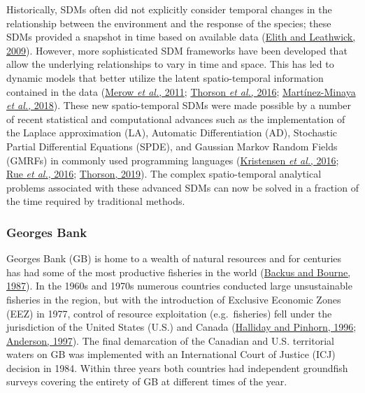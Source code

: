 \documentclass[
]{article}
\begin{document}
Historically, SDMs often did not explicitly consider temporal changes in the relationship between the environment and the response of the species; these SDMs provided a snapshot in time based on available data (\protect\hyperlink{ref-elithSpeciesDistributionModels2009}{Elith and Leathwick, 2009}). However, more sophisticated SDM frameworks have been developed that allow the underlying relationships to vary in time and space. This has led to dynamic models that better utilize the latent spatio-temporal information contained in the data (\protect\hyperlink{ref-merowDevelopingDynamicMechanistic2011}{Merow \emph{et al.}, 2011}; \protect\hyperlink{ref-thorsonJointDynamicSpecies2016}{Thorson \emph{et al.}, 2016}; \protect\hyperlink{ref-martinez-minayaSpeciesDistributionModeling2018}{Martínez-Minaya \emph{et al.}, 2018}). These new spatio-temporal SDMs were made possible by a number of recent statistical and computational advances such as the implementation of the Laplace approximation (LA), Automatic Differentiation (AD), Stochastic Partial Differential Equations (SPDE), and Gaussian Markov Random Fields (GMRFs) in commonly used programming languages (\protect\hyperlink{ref-kristensenTMBAutomaticDifferentiation2016}{Kristensen \emph{et al.}, 2016}; \protect\hyperlink{ref-rueBayesianComputingINLA2016}{Rue \emph{et al.}, 2016}; \protect\hyperlink{ref-thorsonGuidanceDecisionsUsing2019}{Thorson, 2019}). The complex spatio-temporal analytical problems associated with these advanced SDMs can now be solved in a fraction of the time required by traditional methods.

\hypertarget{georges-bank}{%
\subsubsection{Georges Bank}\label{georges-bank}}

Georges Bank (GB) is home to a wealth of natural resources and for centuries has had some of the most productive fisheries in the world (\protect\hyperlink{ref-backusGeorgesBank1987}{Backus and Bourne, 1987}). In the 1960s and 1970s numerous countries conducted large unsustainable fisheries in the region, but with the introduction of Exclusive Economic Zones (EEZ) in 1977, control of resource exploitation (e.g.~fisheries) fell under the jurisdiction of the United States (U.S.) and Canada (\protect\hyperlink{ref-hallidayNorthAtlanticFishery1996}{Halliday and Pinhorn, 1996}; \protect\hyperlink{ref-andersonHistoryFisheriesManagement1997}{Anderson, 1997}). The final demarcation of the Canadian and U.S. territorial waters on GB was implemented with an International Court of Justice (ICJ) decision in 1984. Within three years both countries had independent groundfish surveys covering the entirety of GB at different times of the year.
\end{document}
